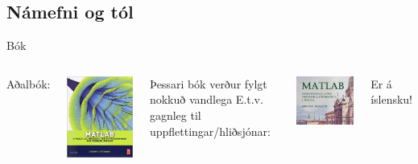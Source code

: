 \documentclass[handout]{beamer}
\begin{document}
\subsection{Námefni og tól}

\begin{frame}{Bók}
\begin{columns}
Aðalbók:
\begin{center}
\includegraphics[width=0.66\linewidth]{Pics/matlab_stormy}
\end{center}
Þessari bók verður fylgt nokkuð vandlega \pause
{}
E.t.v. gagnleg til uppflettingar/hliðsjónar:
\begin{center}
\includegraphics[width=0.7\linewidth]{Pics/matlab_kristjan}
\end{center}
Er á íslensku!
\end{columns}
\end{frame}
\end{document}
